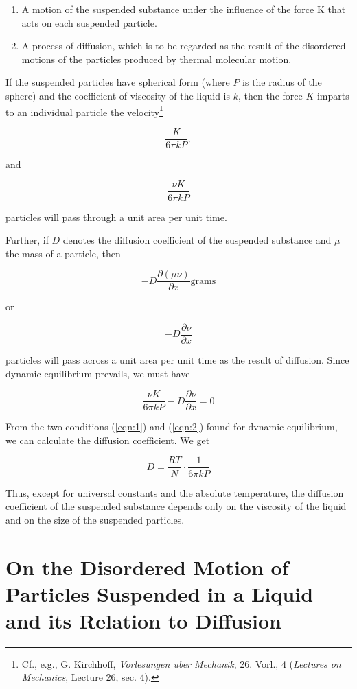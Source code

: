 \documentclass{article}
\begin{document}
\begin{enumerate}
\item A motion of the suspended substance under the influence of the force K that acts on each
suspended particle.
\item A process of diffusion, which is to be regarded as the result of the disordered motions of the
particles produced by thermal molecular motion.
\end{enumerate}

If the suspended particles have spherical form (where $P$ is the radius of the sphere) and the
coefficient of viscosity of the liquid is $k$, then the force $K$ imparts to an individual particle the
velocity\footnote{Cf., e.g., G. Kirchhoff, \textit{Vorlesungen uber Mechanik}, 26. Vorl., 4 (\textit{Lectures on Mechanics}, Lecture 26, sec. 4).}

\[\frac{K}{6\pi kP}, \]

and 

\[\frac{\nu K}{6\pi kP}\]

\noindent particles will pass through a unit area per unit time.

Further, if $D$ denotes the diffusion coefficient of the suspended substance and $\mu$ the mass of a
particle, then

\[-D\frac{\partial (\mu\nu)}{\partial x}\mathrm{grams}\]

\clearpage

or

\[-D\frac{\partial\nu}{\partial x}\]

\noindent particles will pass across a unit area per unit time as the result of diffusion. Since dynamic
equilibrium prevails, we must have

\begin{equation}
\label{eqn:2}
\frac{\nu K}{6\pi kP}-D \frac{\partial\nu}{\partial x}=0 
\end{equation}

From the two conditions (\ref{eqn:1}) and (\ref{eqn:2}) found for dvnamic equilibrium, we can calculate the diffusion coefficient. We get

\[D=\frac{RT}{N} \cdot \frac{1}{6\pi kP} \]

Thus, except for universal constants and the absolute temperature, the diffusion coefficient of the
suspended substance depends only on the viscosity of the liquid and on the size of the suspended
particles.

\section{On the Disordered Motion of Particles Suspended in a Liquid and its Relation to Diffusion}
\end{document}
